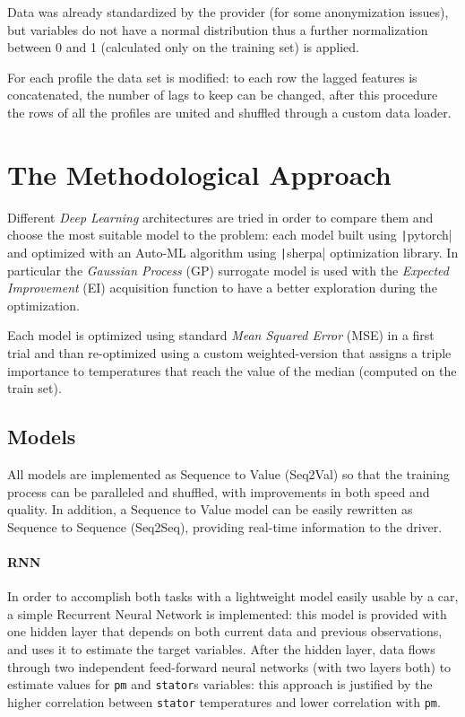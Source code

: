 Data was already standardized by the provider (for some anonymization issues), but variables do not have a normal distribution thus a further normalization between 0 and 1 (calculated only on the training set) is applied.

For each profile the data set is modified: to each row the lagged features is concatenated, the number of lags to keep can be changed, after this procedure the rows of all the profiles are united and shuffled through a custom data loader.

\section{The Methodological Approach}
Different \textit{Deep Learning} architectures are tried in order to compare them and choose the most suitable model to the problem: each model built using \texttt|pytorch| and optimized with an Auto-ML algorithm using \texttt|sherpa| optimization library.
In particular the \textit{Gaussian Process} (GP) surrogate model is used with the \textit{Expected Improvement} (EI) acquisition function to have a better exploration during the optimization.

Each model is optimized using standard \textit{Mean Squared Error} (MSE) in a first trial and than re-optimized using a custom weighted-version that assigns a triple importance to temperatures that reach the value of the median (computed on the train set).

\subsection{Models}
All models are implemented as Sequence to Value (Seq2Val) so that the training process can be paralleled and shuffled, with improvements in both speed and quality.
In addition, a Sequence to Value model can be easily rewritten as Sequence to Sequence (Seq2Seq), providing real-time information to the driver.

\paragraph{RNN}
In order to accomplish both tasks with a lightweight model easily usable by a car, a simple Recurrent Neural Network is implemented: this model is provided with one hidden layer that depends on both current data and previous observations, and uses it to estimate the target variables.
After the hidden layer, data flows through two independent feed-forward neural networks (with two layers both) to estimate values for \verb|pm| and \verb|stator|s variables: this approach is justified by the higher correlation between \verb|stator| temperatures and lower correlation with \verb|pm|.

